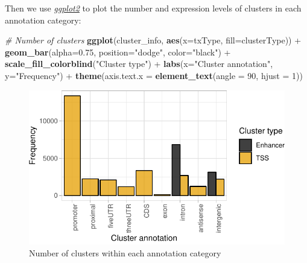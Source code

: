 \documentclass[9pt,a4paper,]{extarticle}
\newenvironment{Shaded}{\begin{snugshade}}{\end{snugshade}}
\newcommand{\KeywordTok}[1]{\textcolor[rgb]{0.13,0.29,0.53}{\textbf{{#1}}}}
\newcommand{\DataTypeTok}[1]{\textcolor[rgb]{0.13,0.29,0.53}{{#1}}}
\newcommand{\DecValTok}[1]{\textcolor[rgb]{0.00,0.00,0.81}{{#1}}}
\newcommand{\FloatTok}[1]{\textcolor[rgb]{0.00,0.00,0.81}{{#1}}}
\newcommand{\StringTok}[1]{\textcolor[rgb]{0.31,0.60,0.02}{{#1}}}
\newcommand{\CommentTok}[1]{\textcolor[rgb]{0.56,0.35,0.01}{\textit{{#1}}}}
\newcommand{\NormalTok}[1]{{#1}}
\begin{document}
Then we use \emph{\href{https://CRAN.R-project.org/package=ggplot2}{ggplot2}} to plot the number and expression levels of clusters in each annotation category:

\begin{Shaded}
\begin{Highlighting}[]
\CommentTok{# Number of clusters}
\KeywordTok{ggplot}\NormalTok{(cluster_info, }\KeywordTok{aes}\NormalTok{(}\DataTypeTok{x=}\NormalTok{txType, }\DataTypeTok{fill=}\NormalTok{clusterType)) +}
\StringTok{    }\KeywordTok{geom_bar}\NormalTok{(}\DataTypeTok{alpha=}\FloatTok{0.75}\NormalTok{, }\DataTypeTok{position=}\StringTok{"dodge"}\NormalTok{, }\DataTypeTok{color=}\StringTok{"black"}\NormalTok{) +}
\StringTok{    }\KeywordTok{scale_fill_colorblind}\NormalTok{(}\StringTok{"Cluster type"}\NormalTok{) +}
\StringTok{    }\KeywordTok{labs}\NormalTok{(}\DataTypeTok{x=}\StringTok{"Cluster annotation"}\NormalTok{, }\DataTypeTok{y=}\StringTok{"Frequency"}\NormalTok{) +}
\StringTok{    }\KeywordTok{theme}\NormalTok{(}\DataTypeTok{axis.text.x =} \KeywordTok{element_text}\NormalTok{(}\DataTypeTok{angle =} \DecValTok{90}\NormalTok{, }\DataTypeTok{hjust =} \DecValTok{1}\NormalTok{))}
\end{Highlighting}
\end{Shaded}

\begin{figure}

{\centering \includegraphics{CAGEWorkflow_files/figure-latex/plotTxTypes1-1} 

}

\caption{Number of clusters within each annotation category}\label{fig:plotTxTypes1}
\end{figure}
\end{document}
